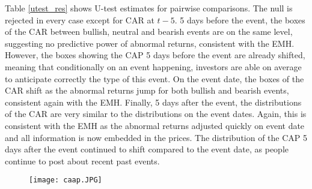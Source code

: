 Table \ref{utest_res} shows U-test estimates for pairwise comparisons. The null is rejected in every case except for CAR at $t-5$. 5 days before the event, the boxes of the CAR between bullish, neutral and bearish events are on the same level, suggesting no predictive power of abnormal returns, consistent with the EMH. However, the boxes showing the CAP 5 days before the event are already shifted, meaning that conditionally on an event happening, investors are able on average to anticipate correctly the type of this event. On the event date, the boxes of the CAR shift as the abnormal returns jump for both bullish and bearish events, consistent again with the EMH. Finally, 5 days after the event, the distributions of the CAR are very similar to the distributions on the event dates. Again, this is consistent with the EMH as the abnormal returns adjusted quickly on event date and all information is now embedded in the prices. The distribution of the CAP 5 days after the event continued to shift compared to the event date, as people continue to post about recent past events.

\begin{figure}[]
    \centering
    \texttt{[image: caap.JPG]}
    \label{fig:ES_cum_abn_pol_MM}
\end{figure}

